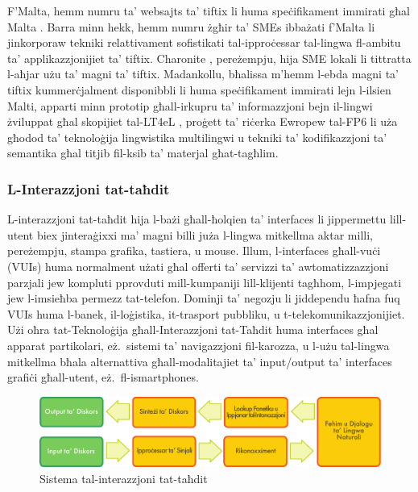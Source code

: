\begin{multicols}{2}
F'Malta, hemm numru ta’ websajts ta’ tiftix li huma speċifikament immirati għal Malta \cite{philb1}. Barra minn hekk, hemm numru żgħir ta’ SMEs ibbażati f’Malta li jinkorporaw tekniki relattivament sofistikati tal-ipproċessar tal-lingwa fl-ambitu ta’ applikazzjonijiet ta’ tiftix. Charonite \cite{charonite1}, pereżempju, hija SME lokali li tittratta l-aħjar użu ta’ magni ta’ tiftix. Madankollu, bħalissa m’hemm l-ebda magni ta’ tiftix kummerċjalment disponibbli li huma speċifikament immirati lejn l-ilsien Malti, apparti minn prototip għall-irkupru ta’ informazzjoni bejn il-lingwi żviluppat għal skopijiet tal-LT4eL \cite{let1}, proġett ta’ riċerka Ewropew tal-FP6 li uża għodod ta’ teknoloġija lingwistika multilingwi u tekniki ta’ kodifikazzjoni ta’ semantika għal titjib fil-ksib ta’ materjal għat-tagħlim.
  
\subsubsection{L-Interazzjoni tat-taħdit }

L-interazzjoni tat-taħdit hija l-bażi għall-ħolqien ta’ interfaces li jippermettu lill-utent biex jinteraġixxi ma’ magni billi juża l-lingwa mitkellma aktar milli, pereżempju, stampa grafika, tastiera, u mouse. Illum, l-interfaces għall-vuċi (VUIs) huma normalment użati għal offerti ta’ servizzi ta’ awtomatizzazzjoni parzjali jew kompluti pprovduti mill-kumpaniji lill-klijenti tagħhom, l-impjegati jew l-imsieħba permezz tat-telefon. Dominji ta’ negozju li jiddependu ħafna fuq VUIs huma l-banek, il-loġistika, it-trasport pubbliku, u t-telekomunikazzjonijiet. Użi oħra tat-Teknoloġija għall-Interazzjoni tat-Taħdit huma interfaces għal apparat partikolari, eż.~sistemi ta’ navigazzjoni fil-karozza, u l-użu tal-lingwa mitkellma bħala alternattiva għall-modalitajiet ta’ input/output ta’ interfaces grafiċi għall-utent, eż.~fl-ismartphones.


\begin{figure}[htb]
  \center 
  \includegraphics[width=\textwidth]{../_media/maltese/simple_speech-based_dialogue_architecture}
  \caption{Sistema tal-interazzjoni tat-taħdit}
  \label{fig:dialoguearch_mt}
\end{figure}


\end{multicols}
